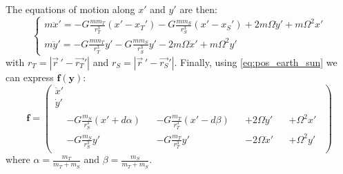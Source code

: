 The equations of motion along \(x'\) and \(y'\) are then:
\begin{equation}
    \begin{cases}
        m \ddot x' = -G \frac{m m_T}{r_T^3} (x' - x_T')
        - G \frac{m m_S}{r_S^3} (x' - x_S')
        + 2 m \Omega \dot y'
        + m \Omega^2 x' \\
        m \ddot y' = -G \frac{m m_T}{r_T^3} y'
        - G \frac{m m_S}{r_S^3} y'
        - 2 m \Omega \dot x'
        + m \Omega^2 y'
    \end{cases}
\end{equation}
with \(r_T = |\vec{r}\,' - \vec{r_T}'|\) and \(r_S = |\vec{r}\,' - \vec{r_S}'|\). Finally, using \autoref{eq:pos_earth_sun} we can express \(\mathbf f(\mathbf y)\):
\begin{equation}
    \mathbf f = \left(\begin{gathered}
        \dot x' \\
        \dot y' \\
        \begin{aligned}
            &-G \frac{m_S}{r_S^3} (x' + d \alpha) &&- G \frac{m_T}{r_T^3} (x' - d \beta) &&+ 2 \Omega \dot y' &&+ \Omega^2 x' \\
            &-G \frac{m_S}{r_S^3} y' &&-G \frac{m_T}{r_T^3} y' &&- 2 \Omega \dot x' &&+ \Omega^2 y'
        \end{aligned}
    \end{gathered}\right)
\end{equation}
where \(\alpha = \frac{m_T}{m_T + m_S}\) and \(\beta = \frac{m_S}{m_T + m_S}\).

